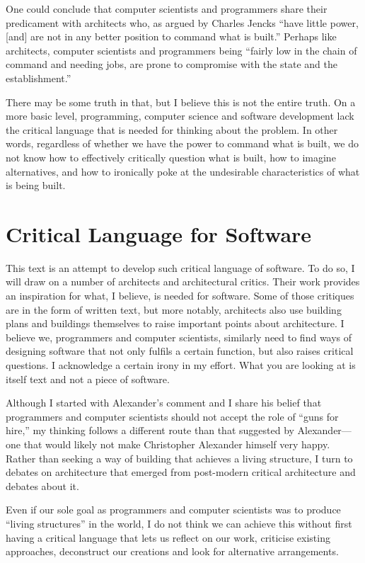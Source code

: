 One could conclude that computer scientists and programmers share their predicament with architects
who, as argued by Charles Jencks ``have little power, [and] are not in any better
position to command what is built.'' Perhaps like architects, computer scientists and programmers
being ``fairly low in the chain of command and needing jobs, are prone to compromise with the
state and the establishment.''

There may be some truth in that, but I believe this is not the entire truth. On a more basic level,
programming, computer science and software development lack the critical language that is needed
for thinking about the problem. In other words, regardless of whether we have the power to command
what is built, we do not know how to effectively critically question what is built, how to imagine
alternatives, and how to ironically poke at the undesirable characteristics of what is being built.

\section{Critical Language for Software}
This text is an attempt to develop such critical language of software. To do so, I will draw on
a number of architects and architectural critics. Their work provides an inspiration for
what, I believe, is needed for software. Some of those critiques are in the form of written text,
but more notably, architects also use building plans and buildings themselves to raise important
points about architecture. I believe we, programmers and computer scientists, similarly need to
find ways of designing software that not only fulfils a certain function, but also raises critical
questions. I acknowledge a certain irony in my effort. What you are looking at is itself text
and not a piece of software.

Although I started with Alexander's comment and I share his belief that programmers and computer
scientists should not accept the role of ``guns for hire,'' my thinking follows a different
route than that suggested by Alexander---one that would likely not make Christopher Alexander
himself very happy.
Rather than seeking a way of building that achieves a living structure, I turn to debates
on architecture that emerged from post-modern critical architecture and debates about it.

Even if our sole goal as programmers and computer scientists was to produce ``living
structures'' in the world, I do not think we can achieve this without first having a critical
language that lets us reflect on our work, criticise existing approaches, deconstruct our creations
and look for alternative arrangements.

